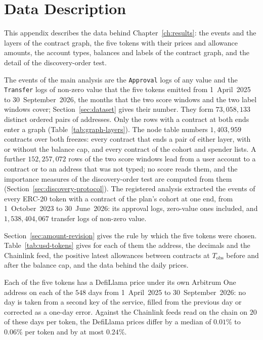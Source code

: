 \section{Data Description}
\label{ch:appendix-data}

This appendix describes the data behind Chapter~\ref{ch:results}: the events and the layers of the contract graph, the five tokens with their prices and allowance amounts, the account types, balances and labels of the contract graph, and the detail of the discovery-order test.


The events of the main analysis are the \texttt{Approval} logs of any value and the \texttt{Transfer} logs of non-zero value that the five tokens emitted from 1~April~2025 to 30~September~2026, the months that the two score windows and the two label windows cover; Section~\ref{sec:dataset} gives their number. They form $73{,}058{,}133$ distinct ordered pairs of addresses. Only the rows with a contract at both ends enter a graph (Table~\ref{tab:graph-layers}). The node table numbers $1{,}403{,}959$ contracts over both freezes: every contract that ends a pair of either layer, with or without the balance cap, and every contract of the cohort and spender lists. A further $152{,}257{,}072$ rows of the two score windows lead from a user account to a contract or to an address that was not typed; no score reads them, and the importance measures of the discovery-order test are computed from them (Section~\ref{sec:discovery-protocol}). The registered analysis extracted the events of every ERC-20 token with a contract of the plan's cohort at one end, from 1~October~2023 to 30~June~2026: its approval logs, zero-value ones included, and $1{,}538{,}404{,}067$ transfer logs of non-zero value.


Section~\ref{sec:amount-revision} gives the rule by which the five tokens were chosen. Table~\ref{tab:usd-tokens} gives for each of them the address, the decimals and the Chainlink feed, the positive latest allowances between contracts at $T_{\mathrm{obs}}$ before and after the balance cap, and the data behind the daily prices.



Each of the five tokens has a DefiLlama price under its own Arbitrum One address on each of the $548$ days from 1~April~2025 to 30~September~2026: no day is taken from a second key of the service, filled from the previous day or corrected as a one-day error. Against the Chainlink feeds read on the chain on $20$ of these days per token, the DefiLlama prices differ by a median of $0.01\%$ to $0.06\%$ per token and by at most $0.24\%$.


